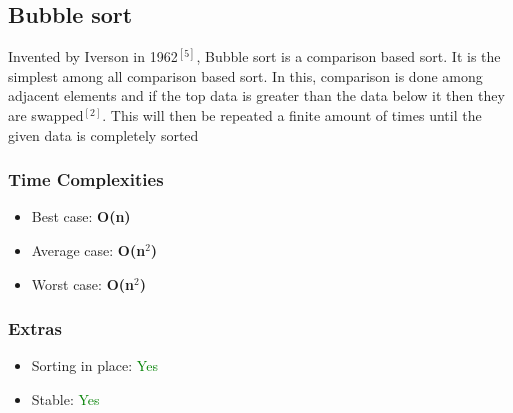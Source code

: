 \documentclass{article}
\begin{document}
\begin{multicols}{2}
\titlespacing*{\subsection}
  {0pt}{4\baselineskip}{1.5\baselineskip}
  
\subsection{Bubble sort}

\begin{comment}
Bubble sort$^{[3]}$ is probably the simplest sorting algorithm due to the fact that it uses a simple nested for loop in which it permanently compares 2 elements, first for loop representing the first element and respectively, second for loop for second element and after each iteration of the primary (first) loop, we have the nth smallest element in place.
\end{comment}

Invented by Iverson in 1962$^{[5]}$, Bubble sort is a comparison based sort. It is the simplest among all comparison based sort. In this, comparison is done among adjacent elements and if the top data is greater than the data below it then they are swapped$^{[2]}$. This will then be repeated a finite amount of times until the given data is completely sorted

\subsubsection{Time Complexities}
\begin{itemize}
    \item Best case: \textbf{O(n)}
    \item Average case: \textbf{O(n$^2$)}
    \item Worst case: \textbf{O(n$^2$)}
\end{itemize}

\subsubsection{Extras}
\begin{itemize}
    \item Sorting in place: \textcolor{green}{Yes}
    \item Stable: \textcolor{green}{Yes}
\end{itemize}

\bigbreak \bigbreak \bigbreak \bigbreak \bigbreak \bigbreak \bigbreak \bigbreak \bigbreak \bigbreak \bigbreak \bigbreak


\end{multicols}
\end{document}
